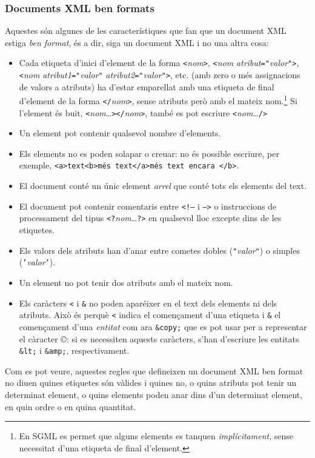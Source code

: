 \subsubsection{Documents XML ben formats}
Aquestes són algunes de les característiques que fan que un document
XML estiga \emph{ben format}, és a dir, siga un document XML i no una
altra cosa:
\begin{itemize}
\item Cada etiqueta d'inici d'element de la forma
  \texttt{<}\emph{nom}\texttt{>}, \texttt{<}\emph{nom}
  \emph{atribut}\texttt{=}\texttt{"}\emph{valor}\texttt{"}\texttt{>},
  \texttt{<}\emph{nom}
  \emph{atribut1}\texttt{=}\texttt{"}\emph{valor}\texttt{"}
  \emph{atribut2}\texttt{=}\texttt{"}\emph{valor}\texttt{"}\texttt{>},
  etc. (amb zero o més assignacions de valors a atributs) ha d'estar
  emparellat amb una etiqueta de final d'element de la forma
  \texttt{</}\emph{nom}\texttt{>}, sense atributs però amb el mateix
  nom.\footnote{En SGML es permet que alguns elements es tanquen
    \emph{implícitament}, sense necessitat d'una etiqueta de final
    d'element.} Si l'element és buit,
  \texttt{<}\emph{nom}\ldots\texttt{></}\emph{nom}\texttt{>}, també es
  pot escriure \texttt{<}\emph{nom}\ldots\texttt{/>}
\item Un element pot contenir qualsevol nombre d'elements.
\item Els elements no es poden solapar o creuar: no és possible
  escriure, per exemple, \texttt{<a>text<b>més text</a>més text encara
    </b>}.
\item El document conté un únic element \emph{arrel} que conté tots
  els elements del text.
\item El document pot contenir comentaris entre \texttt{<!--} i
  \texttt{-->} o instruccions de processament del tipus
  \texttt{<?}\emph{nom}\ldots\texttt{?>} en qualsevol lloc excepte
  dins de les etiquetes.
\item Els valors dels atributs han d'anar entre cometes dobles
  (\texttt{"}\emph{valor}\texttt{"}) o simples
  (\texttt{'}\emph{valor}\texttt{'}).
\item Un element no pot tenir dos atributs amb el mateix nom.
\item Els caràcters \texttt{<} i \texttt{\&} no poden aparéixer en el
  text dels elements ni dels atributs. Això és perquè \texttt{<}
  indica el començament d'una etiqueta i \texttt{\&} el començament
  d'una \emph{entitat} com ara \texttt{\&copy;} que es pot usar per a
  representar el càracter \emph{©}: si es necessiten aquests caràcters,
  s'han d'escriure les entitats \texttt{\&lt;} i \texttt{\&amp;},
  respectivament.
\end{itemize}
Com es pot veure, aquestes regles que defineixen un document XML ben
format no diuen quines etiquetes són vàlides i quines no, o quins
atributs pot tenir un determinat element, o quins elements poden anar
dins d'un determinat element, en quin ordre o en quina quantitat.

